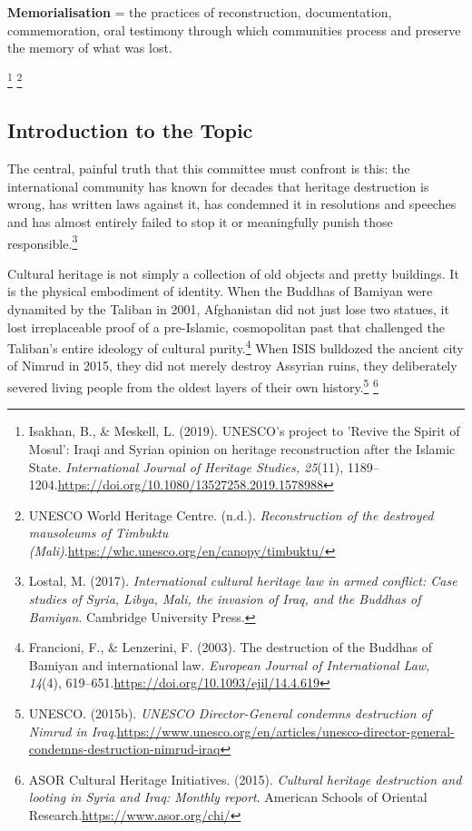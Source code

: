 \textbf{Memorialisation} = the practices of reconstruction, documentation, commemoration, oral testimony through which communities process and preserve the memory of what was lost.

\footnote{Isakhan, B., \& Meskell, L. (2019). UNESCO's project to 'Revive the Spirit of Mosul': Iraqi and Syrian opinion on heritage reconstruction after the Islamic State. \emph{International Journal of Heritage Studies, 25}(11), 1189–1204.\url{https://doi.org/10.1080/13527258.2019.1578988}} \footnote{UNESCO World Heritage Centre. (n.d.). \emph{Reconstruction of the destroyed mausoleums of Timbuktu (Mali)}.\url{https://whc.unesco.org/en/canopy/timbuktu/}}

\subsection{Introduction to the Topic}

The central, painful truth that this committee must confront is this: the international community has known for decades that heritage destruction is wrong, has written laws against it, has condemned it in resolutions and speeches and has almost entirely failed to stop it or meaningfully punish those responsible.\footnote{Lostal, M. (2017). \emph{International cultural heritage law in armed conflict: Case studies of Syria, Libya, Mali, the invasion of Iraq, and the Buddhas of Bamiyan}. Cambridge University Press.}

Cultural heritage is not simply a collection of old objects and pretty buildings. It is the physical embodiment of identity. When the Buddhas of Bamiyan were dynamited by the Taliban in 2001, Afghanistan did not just lose two statues, it lost irreplaceable proof of a pre-Islamic, cosmopolitan past that challenged the Taliban's entire ideology of cultural purity.\footnote{Francioni, F., \& Lenzerini, F. (2003). The destruction of the Buddhas of Bamiyan and international law. \emph{European Journal of International Law, 14}(4), 619–651.\url{https://doi.org/10.1093/ejil/14.4.619}} When ISIS bulldozed the ancient city of Nimrud in 2015, they did not merely destroy Assyrian ruins, they deliberately severed living people from the oldest layers of their own history.\footnote{UNESCO. (2015b). \emph{UNESCO Director-General condemns destruction of Nimrud in Iraq}.\url{https://www.unesco.org/en/articles/unesco-director-general-condemns-destruction-nimrud-iraq}} \footnote{ASOR Cultural Heritage Initiatives. (2015). \emph{Cultural heritage destruction and looting in Syria and Iraq: Monthly report}. American Schools of Oriental Research.\url{https://www.asor.org/chi/}}

